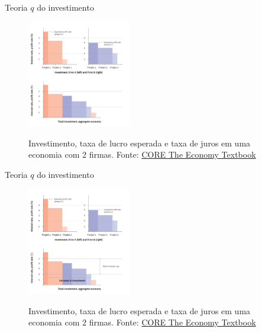 \documentclass[10pt]{beamer}
\begin{document}
\begin{frame}
    {Teoria $q$ do investimento}
    \begin{figure}
        \centering
        \href{https://core-econ.org/the-economy/book/text/14.html\#144-investment-spending}{\includegraphics[width=0.4\textwidth]{./figures/aula8_fig5.PNG}}
        \caption{Investimento, taxa de lucro esperada e taxa de juros em uma economia com 2 firmas. Fonte: \href{https://core-econ.org/the-economy/book/text/14.html\#144-investment-spending}{CORE The Economy Textbook}}
    \end{figure}
\end{frame}

\begin{frame}
    {Teoria $q$ do investimento}
    \begin{figure}
        \centering
        \href{https://core-econ.org/the-economy/book/text/14.html\#144-investment-spending}{\includegraphics[width=0.4\textwidth]{./figures/aula8_fig6.PNG}}
        \caption{Investimento, taxa de lucro esperada e taxa de juros em uma economia com 2 firmas. Fonte: \href{https://core-econ.org/the-economy/book/text/14.html\#144-investment-spending}{CORE The Economy Textbook}}
    \end{figure}
\end{frame}
\end{document}
